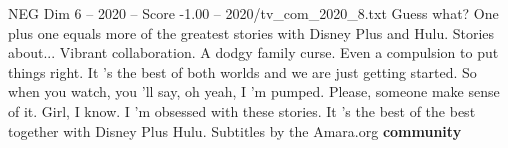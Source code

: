 \begin{textsample}{NEG Dim 6 – 2020 – Score -1.00 – 2020/tv\_com\_2020\_8.txt}  \label{ex:f6_neg_055}
Guess what?
One plus one equals more of the greatest stories with Disney Plus and Hulu.
Stories about...
Vibrant collaboration.
A dodgy family curse.
Even a compulsion to put things right.
It 's the best of both worlds and we are just getting started.
So when you watch, you 'll say, oh yeah, I 'm pumped.
Please, someone make sense of it.
Girl, I know.
I 'm obsessed with these stories.
It 's the best of the best together with Disney Plus Hulu.
Subtitles by the Amara.org \textbf{community}

\end{textsample}
